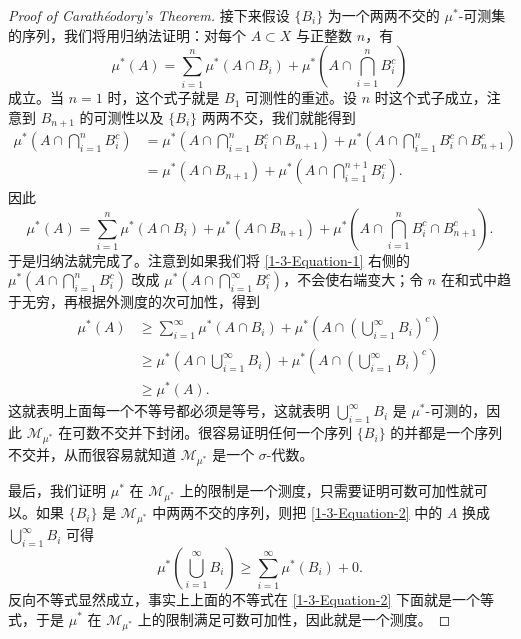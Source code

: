 \documentclass[11pt]{article}
\newcommand{\calM}{\mathcal{M}}
\begin{document}
\begin{proof}[Proof of Carath\'eodory's Theorem]
    接下来假设 $\{B_i\}$ 为一个两两不交的 $\mu^*$-可测集的序列，我们将用归纳法证明：对每个 $A \subset X$ 与正整数 $n$，有
    \begin{equation}\label{1-3-Equation-1}
        \mu^*(A) = \sum_{i=1}^n \mu^*(A\cap B_i) + \mu^*\left(A\cap \bigcap_{i=1}^n B_i^c\right)
    \end{equation}
    成立。当 $n=1$ 时，这个式子就是 $B_1$ 可测性的重述。设 $n$ 时这个式子成立，注意到 $B_{n+1}$ 的可测性以及 $\{B_i\}$ 两两不交，我们就能得到
    \begin{align*}
        \mu^*\left(A\cap \bigcap_{i=1}^n B_i^c\right)
         & = \mu^*\left(A\cap \bigcap_{i=1}^n B_i^c \cap B_{n+1}\right)
        + \mu^*\left(A\cap \bigcap_{i=1}^n B_i^c \cap B_{n+1}^c\right)                 \\
         & = \mu^*(A\cap B_{n+1}) + \mu^*\left(A\cap \bigcap_{i=1}^{n+1} B_i^c\right).
    \end{align*}
    因此
    \[
        \mu^*(A)
        = \sum_{i=1}^n \mu^*(A\cap B_i) + \mu^*(A\cap B_{n+1}) + \mu^*\left(A\cap \bigcap_{i=1}^n B_i^c \cap B_{n+1}^c\right).
    \]
    于是归纳法就完成了。注意到如果我们将 \eqref{1-3-Equation-1} 右侧的 $\mu^*(A\cap \bigcap_{i=1}^n B_i^c)$ 改成 $\mu^*(A\cap \bigcap_{i=1}^{\infty} B_i^c)$，不会使右端变大；令 $n$ 在和式中趋于无穷，再根据外测度的次可加性，得到
    \begin{equation}\label{1-3-Equation-2}
        \begin{aligned}
            \mu^*(A)
             & \ge \sum_{i=1}^{\infty} \mu^*(A\cap B_i) + \mu^*\left(A\cap \left(\bigcup_{i=1}^{\infty} B_i\right)^c\right)               \\
             & \ge \mu^*\left(A\cap \bigcup_{i=1}^{\infty} B_i\right) + \mu^*\left(A\cap \left(\bigcup_{i=1}^{\infty} B_i\right)^c\right) \\
             & \ge \mu^*(A).
        \end{aligned}
    \end{equation}
    这就表明上面每一个不等号都必须是等号，这就表明 $\bigcup_{i=1}^{\infty} B_i$ 是 $\mu^*$-可测的，因此 $\calM_{\mu^*}$ 在可数不交并下封闭。很容易证明任何一个序列 $\{B_i\}$ 的并都是一个序列不交并，从而很容易就知道 $\calM_{\mu^*}$ 是一个 $\sigma$-代数。

    最后，我们证明 $\mu^*$ 在 $\calM_{\mu^*}$ 上的限制是一个测度，只需要证明可数可加性就可以。如果 $\{B_i\}$ 是 $\calM_{\mu^*}$ 中两两不交的序列，则把 \eqref{1-3-Equation-2} 中的 $A$ 换成 $\bigcup_{i=1}^{\infty} B_i$ 可得
    \[
        \mu^*\left(\bigcup_{i=1}^{\infty} B_i\right) \ge \sum_{i=1}^{\infty} \mu^*(B_i) + 0.
    \]
    反向不等式显然成立，事实上上面的不等式在 \eqref{1-3-Equation-2} 下面就是一个等式，于是 $\mu^*$ 在 $\calM_{\mu^*}$ 上的限制满足可数可加性，因此就是一个测度。
\end{proof}
\end{document}
